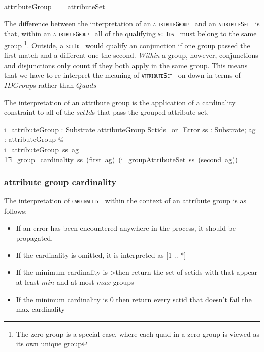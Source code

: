 \documentclass{article}
\def\spec#1{{\tt \small \textsc{{#1}} }}
\begin{document}
\begin{zed}
attributeGroup == \optional[cardinality] \cross attributeSet
\end{zed}

The difference between the interpretation of an \spec{attributeGroup} and an \spec{attributeSet} is that, within an \spec{attributeGroup} all of the 
qualifying \spec{sctIds} must belong to the same group \footnote{The zero group is a special case, where each quad in a zero group is viewed as its own unique group}.  Outside, a \spec{sctId} would qualify an conjunction if one group passed the first match
and a different one the second.  \emph{Within} a group, however, conjunctions and disjunctions only count if they both apply in the same group.  This means
that we have to re-interpret the meaning of \spec{attributeSet} on down in terms of $IDGroup$s rather than $Quads$

The interpretation of an attribute group is the application of a cardinality constraint to all of the $sctId$s that pass the grouped 
attribute set.

\begin{gendef}
   i\_attributeGroup : Substrate \fun attributeGroup \fun Sctids\_or\_Error
\where
   \forall ss : Substrate; ag : attributeGroup @ \\
   i\_attributeGroup~ss~ag = \\
   \t1  i\_group\_cardinality~ss~(first~ag)~(i\_groupAttributeSet~ss~(second~ag))
\end{gendef}

\subsubsection{attribute group cardinality}
The interpretation of \spec{cardinality} within the context of an attribute group is as follows:
\begin{itemize}[noitemsep]
\item If an error has been encountered anywhere in the process, it should be propagated.
\item If the cardinality is omitted, it is interpreted as [1 .. *]
\item If the minimum cardinality is \textgreater then return the set of sctids with that appear at least $min$ and at most $max$ groups
\item If the minimum cardinality is 0 then return every sctid that doesn't fail the max cardinality
\end{itemize}
\end{document}
